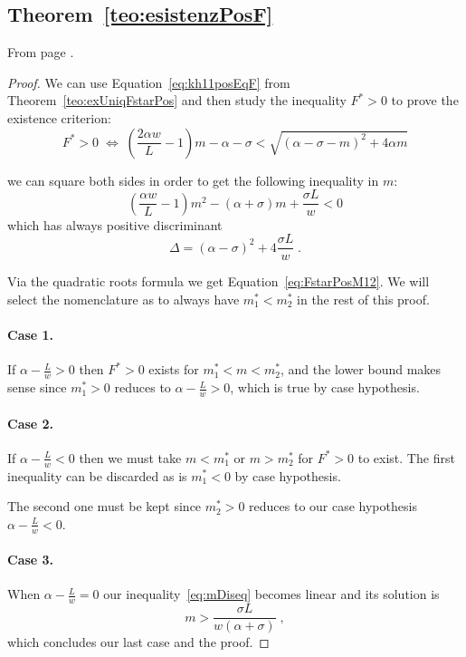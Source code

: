 \subsection{ Theorem~\ref{teo:esistenzPosF} }
From page \pageref{teo:esistenzPosF}.

\begin{proof}
We can use Equation~\eqref{eq:kh11posEqF} from Theorem~\ref{teo:exUniqFstarPos} and then study the
inequality $F^* >0$ to prove the existence criterion:
$$F^* > 0 \; \iff \;
\left( \frac{2 \alpha w}{L} -1 \right) m - \alpha - \sigma < \sqrt{ {(\alpha - \sigma -m)}^2 + 4 \alpha m }$$

we can square both sides in order to get the following inequality in $m$:
\begin{equation}
    \left( \frac{\alpha w}{L} -1 \right) m^2 -( \alpha + \sigma) m + \frac{\sigma L}{w} < 0
    \label{eq:mDiseq}
\end{equation}
which has always positive discriminant
$$\Delta = {(\alpha -\sigma)}^2 +4 \frac{\sigma L}{w} \; .$$

Via the quadratic roots formula we get Equation~\eqref{eq:FstarPosM12}.
We will select the nomenclature as to always have $m_1^* < m_2^*$ in the rest of this proof.

\paragraph{Case 1.}
If $\alpha - \frac{L}{w} >0$ then $F^*>0$ exists for $m_1^* < m < m_2^*$, and the lower bound makes sense since
$m_1^* > 0$ reduces to $\alpha - \frac{L}{w}>0$, which is true by case hypothesis.

\paragraph{Case 2.}
If $\alpha -\frac{L}{w} <0$ then we must take $m < m_1^*$ or $m > m_2^*$ for $F^* >0$ to exist.
The first inequality can be discarded as is $m_1^* <0$ by case hypothesis.

The second one must be kept since $m_2^* >0$ reduces to our case hypothesis $\alpha - \frac{L}{w} < 0$.

\paragraph{Case 3.}
When $\alpha - \frac{L}{w} =0$ our inequality~\eqref{eq:mDiseq} becomes linear and its solution is
$$m > \frac{\sigma L}{w (\alpha +\sigma)} \; ,$$
which concludes our last case and the proof.
\end{proof}









